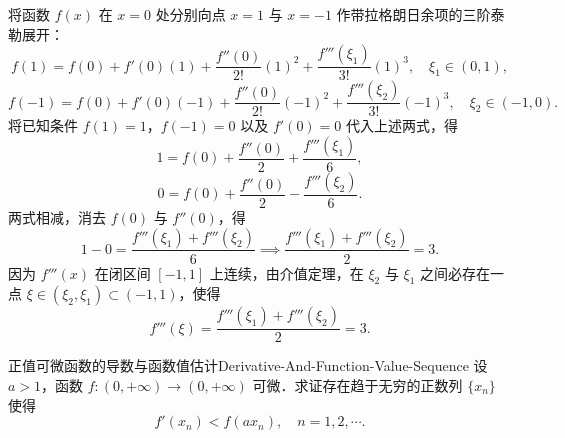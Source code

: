 \begin{myproof}
    将函数 $f(x)$ 在 $x = 0$ 处分别向点 $x = 1$ 与 $x = -1$ 作带拉格朗日余项的三阶泰勒展开：
    \begin{equation}
        f(1) = f(0) + f'(0)(1) + \frac{f''(0)}{2!}(1)^2 + \frac{f'''(\xi_1)}{3!}(1)^3, \quad \xi_1 \in (0, 1),
    \end{equation}
    \begin{equation}
        f(-1) = f(0) + f'(0)(-1) + \frac{f''(0)}{2!}(-1)^2 + \frac{f'''(\xi_2)}{3!}(-1)^3, \quad \xi_2 \in (-1, 0).
    \end{equation}
    将已知条件 $f(1) = 1$，$f(-1) = 0$ 以及 $f'(0) = 0$ 代入上述两式，得
    \begin{equation}
        1 = f(0) + \frac{f''(0)}{2} + \frac{f'''(\xi_1)}{6},
    \end{equation}
    \begin{equation}
        0 = f(0) + \frac{f''(0)}{2} - \frac{f'''(\xi_2)}{6}.
    \end{equation}
    两式相减，消去 $f(0)$ 与 $f''(0)$，得
    \begin{equation}
        1 - 0 = \frac{f'''(\xi_1) + f'''(\xi_2)}{6} \implies \frac{f'''(\xi_1) + f'''(\xi_2)}{2} = 3.
    \end{equation}
    因为 $f'''(x)$ 在闭区间 $[-1, 1]$ 上连续，由介值定理，在 $\xi_2$ 与 $\xi_1$ 之间必存在一点 $\xi \in (\xi_2, \xi_1) \subset (-1, 1)$，使得
    \begin{equation}
        f'''(\xi) = \frac{f'''(\xi_1) + f'''(\xi_2)}{2} = 3.
    \end{equation}
\end{myproof}

\begin{problem}{正值可微函数的导数与函数值估计}{Derivative-And-Function-Value-Sequence}
    设 $a > 1$，函数 $f : (0, +\infty) \to (0, +\infty)$ 可微．求证存在趋于无穷的正数列 $\{x_n\}$ 使得
    \begin{equation}
        f'(x_n) < f(ax_n), \quad n = 1, 2, \cdots.
    \end{equation}
\end{problem}

